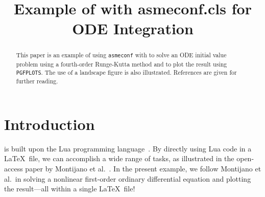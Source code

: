 \documentclass[grid,colorlinks,nofoot]{asmeconf}
\begin{document}

\title{Example of  with asmeconf.cls for ODE Integration}
 

\maketitle



\begin{abstract}
This paper is an example of using {\upshape\texttt{asmeconf}} with {\upshape{}} to solve an ODE initial value problem using a fourth-order Runge-Kutta method and to plot the result using {\upshape\texttt{PGFPLOTS}}. The use of a landscape figure is also illustrated. References are given for further reading.
\end{abstract}


\begin{nomenclature}
\end{nomenclature}


\section{Introduction}
 is built upon the Lua programming language~\cite{lua}. By directly using Lua code in a \LaTeX\ file, we can accomplish a wide range of tasks, as illustrated in the open-access paper by Montijano et al.~\cite{montijano2014}.  In the present example, we follow Montijano et al.\ in solving a nonlinear first-order ordinary differential equation and plotting the result---all within a single \LaTeX\ file!
\end{document}
